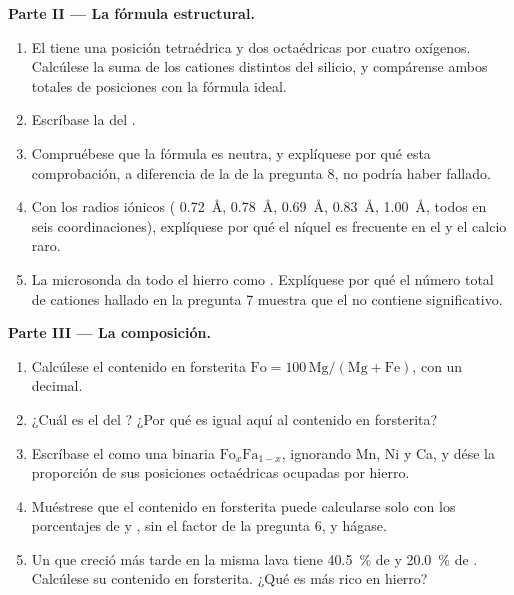 \begin{problem}
\medskip
\noindent\textbf{Parte II --- La fórmula estructural.}
\begin{enumerate}[resume]
  \item El  tiene una posición tetraédrica y dos octaédricas por cuatro oxígenos. Calcúlese la suma de los
        cationes distintos del silicio, y compárense ambos totales de posiciones con la fórmula ideal.
  \item Escríbase la  del .
  \item Compruébese que la fórmula es neutra, y explíquese por qué esta comprobación, a diferencia de la de la
        pregunta 8, no podría haber fallado.
  \item Con los radios iónicos ( \qty{0.72}{\angstrom},  \qty{0.78}{\angstrom},
         \qty{0.69}{\angstrom},  \qty{0.83}{\angstrom},  \qty{1.00}{\angstrom},
        todos en seis coordinaciones), explíquese por qué el níquel es frecuente en el  y el calcio raro.
  \item La microsonda da todo el hierro como . Explíquese por qué el número total de cationes hallado en la
        pregunta 7 muestra que el  no contiene  significativo.
\end{enumerate}

\medskip
\noindent\textbf{Parte III --- La composición.}
\begin{enumerate}[resume]
  \item Calcúlese el contenido en forsterita $\mathrm{Fo} = 100\,\mathrm{Mg}/(\mathrm{Mg} +
        \mathrm{Fe})$, con un decimal.
  \item ¿Cuál es el  del ? ¿Por qué es igual aquí al contenido en forsterita?
  \item Escríbase el  como una  binaria $\mathrm{Fo}_x\mathrm{Fa}_{1-x}$, ignorando Mn, Ni y
        Ca, y dése la proporción de sus posiciones octaédricas ocupadas por hierro.
  \item Muéstrese que el contenido en forsterita puede calcularse solo con los porcentajes de  y ,
        sin el factor de la pregunta 6, y hágase.
  \item Un  que creció más tarde en la misma lava tiene \qty{40.5}{\percent} de  y
        \qty{20.0}{\percent} de . Calcúlese su contenido en forsterita. ¿Qué  es más rico en hierro?
\end{enumerate}


\end{problem}

